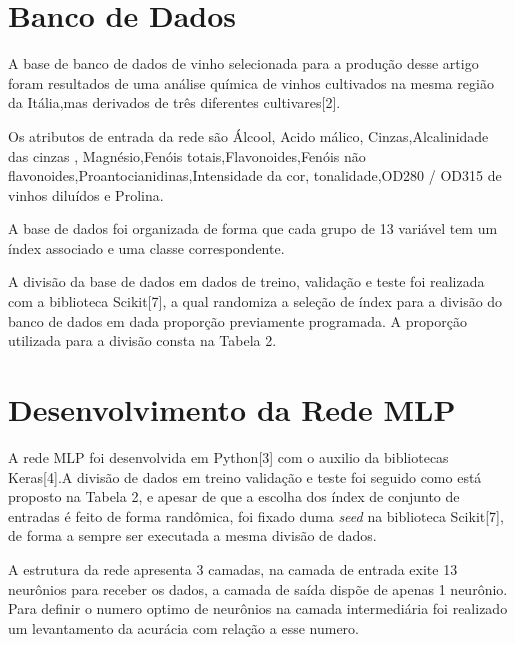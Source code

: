 \section{Banco de Dados}

A base de banco de dados de vinho selecionada para a produção desse artigo foram resultados de uma análise química de vinhos cultivados na mesma região da Itália,mas derivados de três diferentes cultivares[2].

Os atributos de entrada da rede são Álcool, Acido málico, Cinzas,Alcalinidade das cinzas , Magnésio,Fenóis totais,Flavonoides,Fenóis não flavonoides,Proantocianidinas,Intensidade da cor, tonalidade,OD280 / OD315 de vinhos diluídos e Prolina.

A base de dados foi organizada de forma que cada grupo de 13 variável tem um índex associado e uma classe correspondente.



 A divisão da base de dados em dados de treino, validação e teste foi realizada com a biblioteca Scikit[7], a qual randomiza a seleção de índex para a divisão do banco de dados em dada proporção previamente programada. A proporção utilizada para a divisão consta na Tabela 2.


 
\section{Desenvolvimento da Rede MLP}
A rede MLP foi desenvolvida em Python[3] com o auxilio da bibliotecas Keras[4].A divisão de dados em treino validação e teste foi seguido como está proposto na Tabela 2, e apesar de que a escolha dos índex de conjunto de entradas é feito de forma randômica, foi fixado duma \textit{seed} na biblioteca Scikit[7], de forma a sempre ser executada a mesma divisão de dados.

A estrutura da rede apresenta 3 camadas, na camada de entrada exite 13 neurônios para receber os dados, a camada de saída dispõe de apenas 1 neurônio. Para definir o numero optimo de neurônios na camada intermediária foi realizado um levantamento da acurácia com relação a esse numero.

